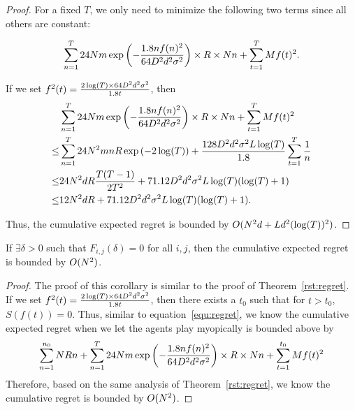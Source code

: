 \begin{proof}
For a fixed $T$, we only need to minimize the following two terms since all others are constant:

\begin{align}
\sum_{n=1}^{T} 24Nm\exp\left(-\frac{1.8n f(n)^2}{64 D^2 d^2\sigma^2}\right)\times R \times Nn+ \sum_{t=1}^{T}Mf(t)^2. \label{equ:regret}
\end{align}

If we set $f^2(t)=\frac{2\log(T)\times 64D^2 d^2\sigma^2}{1.8t}$, then
\begin{align}
&\sum_{n=1}^{T} 24Nm\exp\left(-\frac{1.8n f(n)^2}{64 D^2 d^2\sigma^2}\right)\times R \times Nn+ \sum_{t=1}^{T}Mf(t)^2 \nonumber \\ 
\leq & \sum_{n=1}^{T} 24N^2 mnR \exp\left(-2\log(T)\right)  + \frac{128D^2 d^2\sigma^2 L\log(T)}{1.8}\sum_{t=1}^{T}\frac{1}{n} \nonumber \\
\leq &  24N^2 d R\frac{T(T-1)}{2T^2}  + 71.12 D^2 d^2\sigma^2 L\log(T)(\log(T)+1) \nonumber \\
\leq &  12 N^2 d R  + 71.12 D^2 d^2\sigma^2 L\log(T)(\log(T)+1). \nonumber
\end{align}

Thus, the cumulative expected regret is bounded by $O(N^2 d + L d^2(\log(T))^2)$.
\end{proof}

\begin{corollary}
If $\exists \delta>0$ such that $F_{i,j}(\delta)=0$ for all $i,j$, then the cumulative expected regret is bounded by $O(N^2)$.
\end{corollary}

\begin{proof}
The proof of this corollary is similar to the proof of Theorem~\ref{rst:regret}. If we set $f^2(t)=\frac{2\log(T)\times 64D^2 d^2\sigma^2}{1.8t}$, then there exists a $t_{0}$ such that for $t>t_{0}$, $S(f(t))=0$. Thus, similar to equation~\eqref{equ:regret}, we know the cumulative expected regret when we let the agents play myopically is bounded above by
\begin{align}
\sum_{n=1}^{n_{0}}NRn + \sum_{n=1}^{T} 24Nm\exp\left(-\frac{1.8n f(n)^2}{64 D^2 d^2\sigma^2}\right)\times R \times Nn+ \sum_{t=1}^{t_{0}}Mf(t)^2 \nonumber
\end{align}
Therefore, based on the same analysis of Theorem~\ref{rst:regret}, we know the cumulative regret is bounded by $O(N^2)$.
\end{proof}

